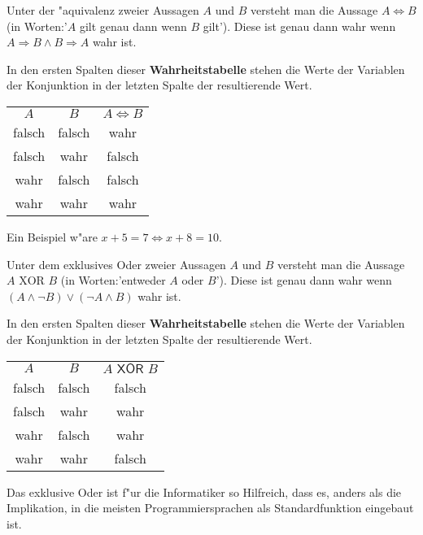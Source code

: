 \begin{definition}["Aquivalenz]
Unter der "aquivalenz zweier Aussagen $A$ und $B$ versteht man die Aussage $A \iff B$ (in Worten:'$A$ gilt genau dann wenn $B$ gilt'). Diese ist genau dann wahr wenn $A \Rightarrow B \land B \Rightarrow A$ wahr ist. 
\end{definition}
In den ersten Spalten dieser \textbf{Wahrheitstabelle} stehen die Werte der Variablen der Konjunktion in der letzten Spalte der resultierende Wert.
\begin{center}
\begin{tabular}{|c|c||c|}
 $A$ & $B$ & $A \iff B$  \\ 
\cellcolor{ared}falsch & \cellcolor{ared}falsch & \cellcolor{agreen}wahr    \\ 
\cellcolor{ared}falsch & \cellcolor{agreen}wahr & \cellcolor{ared}falsch    \\ 
\cellcolor{agreen}wahr & \cellcolor{ared}falsch & \cellcolor{ared}falsch    \\ 
\cellcolor{agreen}wahr & \cellcolor{agreen}wahr & \cellcolor{agreen}wahr    \\ 
\hline
\end{tabular}
\end{center}
Ein Beispiel w"are $x + 5 = 7 \iff x + 8 = 10$.


\begin{definition}
Unter dem exklusives Oder zweier Aussagen $A$ und $B$ versteht man die Aussage $A \text{ XOR } B$ (in Worten:'entweder $A$ oder $B$'). Diese ist genau dann wahr wenn $(A \land \neg B) \lor (\neg A \land B)$ wahr ist. 
\end{definition}
In den ersten Spalten dieser \textbf{Wahrheitstabelle} stehen die Werte der Variablen der Konjunktion in der letzten Spalte der resultierende Wert.
\begin{center}
\begin{tabular}{|c|c||c|}
$A$ & $B$ & $A \textsf{ XOR } B$  \\ 
\cellcolor{ared}falsch &  \cellcolor{ared}falsch &  \cellcolor{ared}falsch    \\ 
\cellcolor{ared}falsch & \cellcolor{agreen}wahr & \cellcolor{agreen}wahr    \\ 
\cellcolor{agreen}wahr & \cellcolor{ared}falsch & \cellcolor{agreen}wahr    \\ 
\cellcolor{agreen}wahr & \cellcolor{agreen}wahr & \cellcolor{ared}falsch    \\ 
\hline
\end{tabular}
\end{center}
Das exklusive Oder ist f"ur die Informatiker so Hilfreich, dass es, anders als die Implikation, in die meisten Programmiersprachen als Standardfunktion eingebaut ist.


